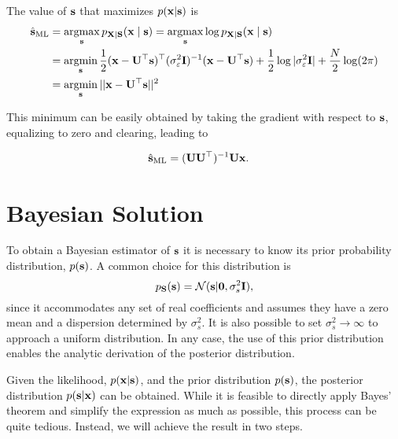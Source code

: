 The value of ${\mathbf s}$ that maximizes $p({\mathbf x} | {\mathbf s})$ is
\begin{align}
\hat{{\mathbf s}}_\text{ML} 
   &= \operatorname*{argmax}_{{\mathbf s}} p_{{\bf X}|{\bf S}}( {\mathbf x} \mid {\mathbf s} ) 
    = \operatorname*{argmax}_{{\mathbf s}} \log p_{{\bf X}|{\bf S}}( {\mathbf x} \mid {\mathbf s} ) \nonumber \\
   &= \operatorname*{argmin}_{{\mathbf s}} \frac{1}{2} ({\mathbf x} - {\mathbf U}^\top{\mathbf s})^\top(\sigma_\varepsilon^2{\mathbf I})^{-1}
                              ({\mathbf x} - {\mathbf U}^\top{\mathbf s}) 
                + \frac{1}{2} \log|\sigma_\varepsilon^2{\mathbf I}|+\frac{N}{2}\log(2\pi) 
                \nonumber \\
   &= \operatorname*{argmin}_{{\mathbf s}} ||{\mathbf x} - {\mathbf U}^\top{\mathbf s}||^2     \nonumber \\
\label{sml_comp}
\end{align}

This minimum can be easily obtained by taking the gradient with respect to ${\mathbf s}$, equalizing to zero and clearing, leading to
\begin{framed}
\begin{align}
\hat{{\mathbf s}}_\text{ML} &= ({\mathbf U} {\mathbf U}^\top)^{-1} {\mathbf U}{\mathbf x}.
\label{sml}
\end{align}
\end{framed}

\section{Bayesian Solution}

To obtain a Bayesian estimator of ${\mathbf s}$ it is necessary to know its prior probability distribution, $p({\mathbf s})$. A common choice for this distribution is
\begin{equation}
p_{\bf S}({\mathbf s}) = {\mathcal N}({\mathbf s} | \mathbf{0}, \sigma_s^2{\mathbf I}),
\end{equation}
since it accommodates any set of real coefficients and assumes they have a zero mean and a dispersion determined by $\sigma_s^2 $. It is also possible to set $\sigma_s^2 \rightarrow \infty$ to approach a uniform distribution. In any case, the use of this prior distribution enables the analytic derivation of the posterior distribution.

Given the likelihood, $p({\mathbf x} | {\mathbf s})$, and the prior distribution $p({\mathbf s})$, the posterior distribution $p({\mathbf s} | {\mathbf x}) $ can be obtained. While it is feasible to directly apply Bayes' theorem and simplify the expression as much as possible, this process can be quite tedious. Instead, we will achieve the result in two steps.

